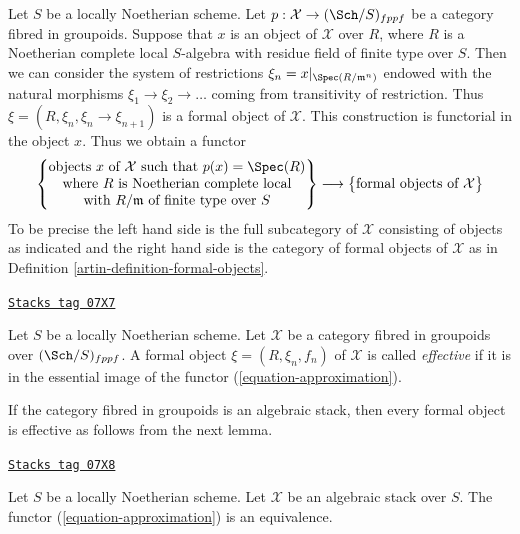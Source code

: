 Let $S$ be a locally Noetherian scheme. Let
$p : \mathcal{X} \to (\Sch/S)_{fppf}$ be a category fibred in groupoids.
Suppose that $x$ is an object of $\mathcal{X}$ over $R$, where $R$ is a
Noetherian complete local $S$-algebra with residue field of finite type
over $S$. Then we can consider the system of restrictions
$\xi_n = x|_{\Spec(R/\mathfrak m^n)}$ endowed with the natural morphisms
$\xi_1 \to \xi_2 \to \ldots$ coming from transitivity of restriction.
Thus $\xi = (R, \xi_n, \xi_n \to \xi_{n + 1})$ is a formal object of
$\mathcal{X}$. This construction is functorial in the object $x$.
Thus we obtain a functor
\begin{equation}
\label{equation-approximation}
\left\{
\begin{matrix}
\text{objects }x\text{ of }\mathcal{X} \text{ such that }p(x) = \Spec(R) \\
\text{where }R\text{ is Noetherian complete local}\\
\text{with }R/\mathfrak m\text{ of finite type over }S
\end{matrix}
\right\}
\longrightarrow
\left\{
\begin{matrix}
\text{formal objects of }\mathcal{X}
\end{matrix}
\right\}
\end{equation}
To be precise the left hand side is the full subcategory of $\mathcal{X}$
consisting of objects as indicated and the right hand side is the category
of formal objects of $\mathcal{X}$ as in
Definition \ref{artin-definition-formal-objects}.

\begin{definition}[Effective]
\label{artin-definition-effective}
\href{https://stacks.math.columbia.edu/tag/07X7}{\texttt{Stacks tag 07X7}}

Let $S$ be a locally Noetherian scheme. Let $\mathcal{X}$ be a category
fibred in groupoids over $(\Sch/S)_{fppf}$. A formal object
$\xi = (R, \xi_n, f_n)$ of $\mathcal{X}$ is called {\it effective}
if it is in the essential image of the functor
(\ref{equation-approximation}).
\end{definition}

If the category fibred in groupoids is an algebraic stack, then every
formal object is effective as follows from the next lemma.

\begin{lemma}[Effective]
\label{artin-lemma-effective}
\href{https://stacks.math.columbia.edu/tag/07X8}{\texttt{Stacks tag 07X8}}

Let $S$ be a locally Noetherian scheme. Let $\mathcal{X}$ be an algebraic
stack over $S$. The functor (\ref{equation-approximation}) is an equivalence.
\end{lemma}

